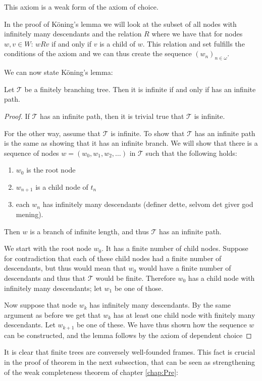 \documentclass[../main.tex]{subfiles}
\begin{document}
This axiom is a weak form of the axiom of choice. 


In the proof of Köning's
lemma we will look at the subset of all nodes with infinitely many descendants
and the relation $R$ where we have that for nodes $w,v\in W$:  $wRv$ if and only if $v$ is a child of $w$. This relation and
set
fulfills the conditions of the axiom and we can thus create the sequence
$(w_n)_{n\in\omega}$.

We can now state Köning's lemma:
\begin{lemma}
	\label{lem:kong}
	Let $\mathcal{T}$ be a finitely branching tree. Then it is infinite if
	and only if has an infinite path.
\end{lemma}
\begin{proof}
	If $\mathcal{T}$ has an infinite path, then it is trivial true that
	$\mathcal{T}$ is infinite. 

	For the other way, assume that $\mathcal{T}$ is infinite. To show that
	$\mathcal{T}$ has an infinite path is the same as showing that it has
	an infinite branch. We will show that there is a sequence of nodes
	$w=(w_0,w_1,w_2,\ldots)$ in $\mathcal{T}$ such that the following holds:
	\begin{enumerate}
		\item $w_0$ is the root node
		\item $w_{n+1}$ is a child node of $t_n$
		\item each $w_n$ has infinitely many descendants (definer
			dette, selvom det giver god mening).
	\end{enumerate}
	Then $w$ is a branch of infinite length, and thus $\mathcal{T}$ has an
	infinite path.

	We start with the root node $w_0$. It has a finite number of child
	nodes. Suppose for contradiction that each of these child nodes had a
	finite number of descendants, but thus would mean that $w_0$ would have
	a finite number of descendants and thus that $\mathcal{T}$ would be
	finite. Therefore $w_0$ has a child node with infinitely many
	descendants; let $w_1$ be one of those.

	Now suppose that node $w_k$ has infinitely many descendants. By the
	same argument as before we get that $w_k$ has at least one child node
	with finitely many descendants. Let $w_{k+1}$ be one of these. We have
	thus shown how the sequence $w$ can be constructed, and the lemma
	follows by the axiom of dependent choice
\end{proof}
It is clear that finite trees are conversely well-founded frames. This fact is crucial
in the proof of theorem in the next subsection, that can be seen as strengthening of the
weak completeness theorem of chapter \ref{chap:Pre}:
\end{document}
